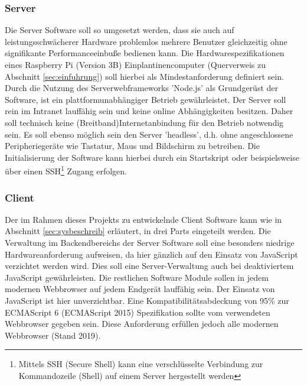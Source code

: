 \subsubsection{Server}\label{sec:servertech}
Die Server Software soll so umgesetzt werden, dass sie auch auf leistungsschwächerer Hardware problemlos mehrere Benutzer gleichzeitig ohne signifikante Performanceeinbuße bedienen kann. Die Hardwarespezifikationen eines Raspberry Pi (Version 3B) Einplantinencomputer (Querverweis zu Abschnitt \ref{sec:einfuhrung}) soll hierbei als Mindestanforderung definiert sein. Durch die Nutzung des Serverwebframeworks 'Node.js' als Grundgerüst der Software, ist ein plattformunabhängiger Betrieb gewährleistet. Der Server soll rein im Intranet lauffähig sein und keine online Abhängigkeiten besitzen. Daher soll technisch keine (Breitband)Internetanbindung für den Betrieb notwendig sein. Es soll ebenso möglich sein den Server 'headless', d.h. ohne angeschlossene Peripheriegeräte wie Tastatur, Maus und Bildschirm zu betreiben. Die Initialisierung der Software kann hierbei durch ein Startskript oder beispielsweise über einen SSH\footnote{Mittels SSH (Secure Shell) kann eine verschlüsselte Verbindung zur Kommandozeile (Shell) auf einem Server hergestellt werden} Zugang erfolgen.
\subsubsection{Client}\label{sec:clienttech}
Der im Rahmen dieses Projekts zu entwickelnde Client Software kann wie in Abschnitt \ref{sec:sysbeschreib} erläutert, in drei Parts eingeteilt werden. Die Verwaltung im Backendbereichs der Server Software soll eine besonders niedrige Hardwareanforderung aufweisen, da hier gänzlich auf den Einsatz von JavaScript verzichtet werden wird. Dies soll eine Server-Verwaltung auch bei deaktiviertem JavaScript gewährleisten. Die restlichen Software Module sollen in jedem modernen Webbrowser auf jedem Endgerät lauffähig sein. Der Einsatz von JavaScript ist hier unverzichtbar. Eine Kompatibilitätsabdeckung von 95\% zur ECMAScript 6 (ECMAScript 2015) Spezifikation sollte vom verwendeten Webbrowser gegeben sein. Diese Anforderung erfüllen jedoch alle modernen Webbrowser (Stand 2019)\cite{ECMAScri7:online}. 
